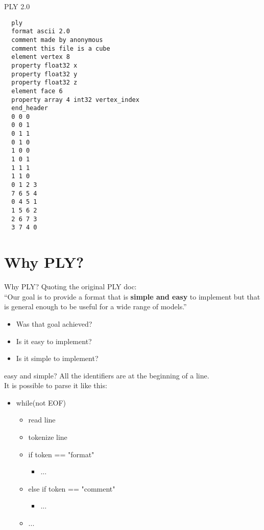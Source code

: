 \documentclass[paper=screen,orient=landscape,style=simple]{powerdot}
\begin{document}
\begin{slide}[method=file]{PLY 2.0}
\linespread{0}
\begin{lstlisting}
  ply
  format ascii 2.0
  comment made by anonymous
  comment this file is a cube
  element vertex 8
  property float32 x
  property float32 y
  property float32 z
  element face 6
  property array 4 int32 vertex_index
  end_header
  0 0 0
  0 0 1
  0 1 1
  0 1 0
  1 0 0
  1 0 1
  1 1 1
  1 1 0
  0 1 2 3
  7 6 5 4
  0 4 5 1
  1 5 6 2
  2 6 7 3
  3 7 4 0
\end{lstlisting}
\end{slide}

\section{Why PLY?}

\begin{slide}{Why PLY?}
Quoting the original PLY doc:\\[1em]
``Our goal is to provide a format that is \textbf{simple and easy} to implement
but that is general enough to be useful for a wide range of models.''

\begin{itemize}
  \item Was that goal achieved?
  \item Is it easy to implement?
  \item Is it simple to implement?
\end{itemize}
\end{slide}

\begin{slide}{easy and simple?}
All the identifiers are at the beginning of a line.\\
It is possible to parse it like this:

\begin{itemize}
  \item while(not EOF)
    \begin{itemize}
      \item read line
      \item tokenize line
      \item if token == "format"
        \begin{itemize}
          \item ...
        \end{itemize}
      \item else if token == "comment"
        \begin{itemize}
          \item ...
        \end{itemize}
      \item ...
    \end{itemize}
\end{itemize}
\end{slide}
\end{document}

